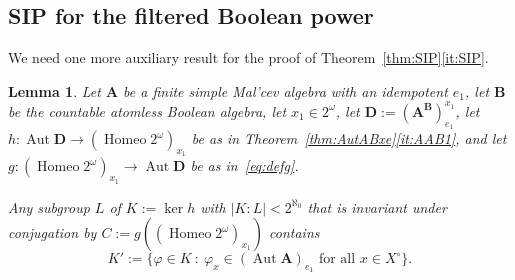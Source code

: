 \documentclass[12pt,a4paper,reqno]{amsart}
\numberwithin{equation}{section}
\theoremstyle{plain}
\newtheorem{lem}[thm]{Lemma}
\theoremstyle{definition}
\newcommand{\A}{\mathbf{A}}
\newcommand{\B}{\mathbf{B}}
\newcommand{\D}{\mathbf{D}}
\DeclareMathOperator{\Aut}{Aut}
\DeclareMathOperator{\Homeo}{Homeo}
\newcommand{\st}{\: :\:}
\begin{document}
\subsection{SIP for the filtered Boolean power}
 We need one more auxiliary result for the proof of Theorem~\ref{thm:SIP}\eqref{it:SIP}.

\begin{lem} \label{lem:invariant}
 Let $\A$ be a finite simple Mal'cev algebra with an idempotent $e_1$,
 let $\B$ be the countable atomless Boolean algebra, let $x_1\in 2^\omega$, let $\D := (\A^\B)^{x_1}_{e_1}$,
   let $h\colon \Aut\D\to(\Homeo 2^\omega)_{x_1}$ be as in Theorem~\ref{thm:AutABxe}\eqref{it:AAB1}, and let
   $g\colon(\Homeo 2^\omega)_{x_1}\to\Aut\D$ be as in~\eqref{eq:defg}.  

   Any subgroup $L$ of $K := \ker h$ with $|K:L| < 2^{\aleph_0}$ that is invariant under conjugation by
   $C := g((\Homeo 2^\omega)_{x_1})$
 contains
\[ K' := \{\varphi\in K \st \varphi_x \in(\Aut\A)_{e_1} \text{ for all } x\in X^\circ \}. \]
\end{lem}   
\end{document}
